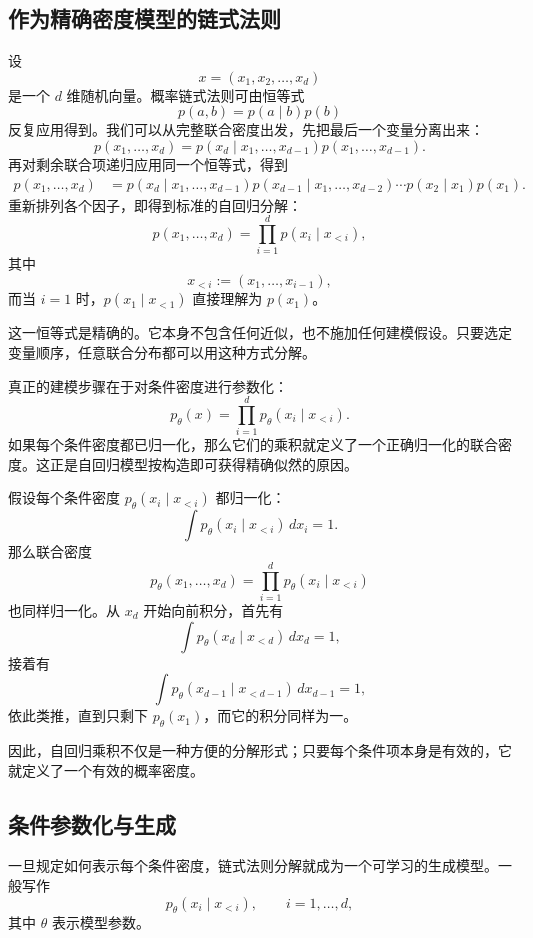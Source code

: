 \subsection{作为精确密度模型的链式法则}

设
\[
x=(x_1,x_2,\dots,x_d)
\]
是一个 $d$ 维随机向量。概率链式法则可由恒等式
\[
p(a,b)=p(a\mid b)p(b)
\]
反复应用得到。我们可以从完整联合密度出发，先把最后一个变量分离出来：
\[
p(x_1,\dots,x_d)
=
p(x_d\mid x_1,\dots,x_{d-1})p(x_1,\dots,x_{d-1}).
\]
再对剩余联合项递归应用同一个恒等式，得到
\[
\begin{aligned}
p(x_1,\dots,x_d)
&=
p(x_d\mid x_1,\dots,x_{d-1})
p(x_{d-1}\mid x_1,\dots,x_{d-2})
\cdots
p(x_2\mid x_1)p(x_1).
\end{aligned}
\]
重新排列各个因子，即得到标准的自回归分解：
\[
\boxed{
p(x_1,\dots,x_d)
=
\prod_{i=1}^d p(x_i\mid x_{<i}),
}
\]
其中
\[
x_{<i}:=(x_1,\dots,x_{i-1}),
\]
而当 $i=1$ 时，$p(x_1\mid x_{<1})$ 直接理解为 $p(x_1)$。

这一恒等式是精确的。它本身不包含任何近似，也不施加任何建模假设。只要选定变量顺序，任意联合分布都可以用这种方式分解。

真正的建模步骤在于对条件密度进行参数化：
\[
p_\theta(x)
=
\prod_{i=1}^d p_\theta(x_i\mid x_{<i}).
\]
如果每个条件密度都已归一化，那么它们的乘积就定义了一个正确归一化的联合密度。这正是自回归模型按构造即可获得精确似然的原因。

\begin{tcolorbox}[
  colback=blue!4,
  colframe=blue!50!black,
  title={为什么自回归乘积是有效的概率密度},
  boxrule=0.6pt,
  arc=2mm,
  left=2mm,
  right=2mm,
  top=1mm,
  bottom=1mm
]
假设每个条件密度 $p_\theta(x_i\mid x_{<i})$ 都归一化：
\[
\int p_\theta(x_i\mid x_{<i})\,dx_i=1.
\]
那么联合密度
\[
p_\theta(x_1,\dots,x_d)
=
\prod_{i=1}^d p_\theta(x_i\mid x_{<i})
\]
也同样归一化。从 $x_d$ 开始向前积分，首先有
\[
\int p_\theta(x_d\mid x_{<d})\,dx_d=1,
\]
接着有
\[
\int p_\theta(x_{d-1}\mid x_{<d-1})\,dx_{d-1}=1,
\]
依此类推，直到只剩下 $p_\theta(x_1)$，而它的积分同样为一。

因此，自回归乘积不仅是一种方便的分解形式；只要每个条件项本身是有效的，它就定义了一个有效的概率密度。
\end{tcolorbox}

\subsection{条件参数化与生成}

一旦规定如何表示每个条件密度，链式法则分解就成为一个可学习的生成模型。一般写作
\[
p_\theta(x_i\mid x_{<i}),
\qquad i=1,\dots,d,
\]
其中 $\theta$ 表示模型参数。

